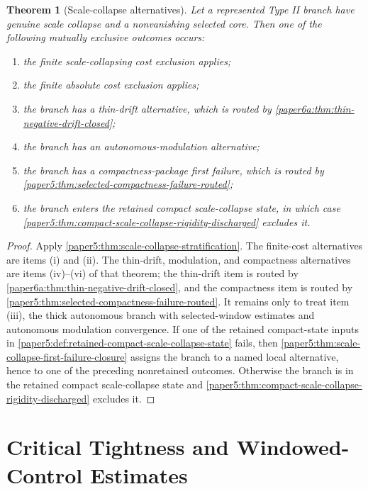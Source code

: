 \documentclass[11pt]{amsart}
\theoremstyle{plain}
\newtheorem{theorem}{Theorem}[section]
\theoremstyle{definition}
\theoremstyle{remark}
\begin{document}
\begin{theorem}[Scale-collapse alternatives]\label{paper5:thm:scale-collapse-alternatives}
Let a represented Type II branch have genuine scale collapse and a nonvanishing selected core.
Then one of the following mutually exclusive outcomes occurs:
\begin{enumerate}[label=(\roman*)]
  \item the finite scale-collapsing cost exclusion applies;
  \item the finite absolute cost exclusion applies;
  \item the branch has a thin-drift alternative, which is routed by
  \cref{paper6a:thm:thin-negative-drift-closed};
  \item the branch has an autonomous-modulation alternative;
  \item the branch has a compactness-package first failure, which is routed by
  \cref{paper5:thm:selected-compactness-failure-routed};
  \item the branch enters the retained compact scale-collapse state, in which
  case \cref{paper5:thm:compact-scale-collapse-rigidity-discharged} excludes it.
\end{enumerate}
\end{theorem}

\begin{proof}
Apply \cref{paper5:thm:scale-collapse-stratification}.  The finite-cost alternatives are
items \textup{(i)} and \textup{(ii)}.  The thin-drift, modulation, and
compactness alternatives are items \textup{(iv)}--\textup{(vi)} of that
theorem; the thin-drift item is routed by
\cref{paper6a:thm:thin-negative-drift-closed}, and the compactness item is
routed by \cref{paper5:thm:selected-compactness-failure-routed}.  It remains
only to treat item \textup{(iii)}, the thick autonomous branch with
selected-window estimates and autonomous modulation convergence.  If one of the
retained compact-state inputs in
\cref{paper5:def:retained-compact-scale-collapse-state} fails, then
\cref{paper5:thm:scale-collapse-first-failure-closure} assigns the branch to a
named local alternative, hence to one of the preceding nonretained outcomes.
Otherwise the branch is in the retained compact scale-collapse state and
\cref{paper5:thm:compact-scale-collapse-rigidity-discharged} excludes it.
\end{proof}

\clearpage
\section{Critical Tightness and Windowed-Control Estimates}
\label{sec:c6-c7-cost-exclusion}
\end{document}
